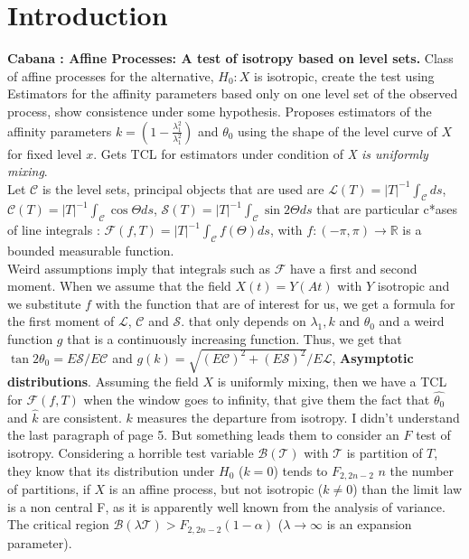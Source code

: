 \documentclass[12pt]{article}
\renewcommand{\hat}{\widehat}
\theoremstyle{Theorem}
\theoremstyle{definition}
\begin{document}
\section{Introduction}
\textbf{Cabana : Affine Processes: A test of isotropy based on level sets.} 
Class of affine processes for the alternative, $H_{0} :X$ is isotropic, create the test using Estimators for the affinity parameters based only on one level set of the observed process, show consistence under some hypothesis. Proposes estimators of the affinity parameters $k = (1 - \frac{\lambda_{1}^{2}}{\lambda_{1}^{2}})$ and $\theta_{0}$ using the shape of the level curve of $X$ for fixed level $x$. Gets TCL for estimators under condition of \textit{X is uniformly mixing}. \\
Let $\mathscr{C}$ is the level sets, principal objects that are used are $\mathscr{L}(T) = |T|^{-1}\int_{\mathscr{C}}ds$, $\mathscr{C}(T) = |T|^{-1}\int_{\mathcal{C}} \cos\Theta ds$, $\mathscr{S}(T) = |T|^{-1}\int_{\mathscr{C}} \sin2\Theta ds$ that are particular c*ases of line integrals : $\mathscr{F}(f, T) = |T|^{-1}\int_{\mathscr{C}}f(\Theta)ds$, with $f:(-\pi, \pi) \to \mathbb{R}$ is a bounded measurable function.\\
Weird assumptions imply that integrals such as $\mathscr{F}$ have a first and second moment. When we assume that the field $X(t) = Y(At)$ with $Y$ isotropic and we substitute $f$ with the function that are of interest for us, we get a formula for the first moment of $\mathscr{L}$, $\mathscr{C}$ and $\mathscr{S}$. that only depends on $\lambda_{1}, k$ and $\theta_{0}$ and a weird function $g$ that is a continuously increasing function. Thus, we get that $\tan 2\theta_{0} = E\mathscr{S}/E\mathscr{C}$ and $g(k) = \sqrt{(E\mathscr{C})^2 + (E\mathscr{S})^2}/E\mathscr{L}$, \textbf{Asymptotic distributions}. Assuming the field $X$ is uniformly mixing, then we have a TCL for $\mathscr{F}(f, T)$ when the window goes to infinity, that give them the fact that $\hat{\theta_{0}}$ and $\hat{k}$ are consistent. $k$ measures the departure from isotropy. I didn't understand the last paragraph of page 5. But something leads them to consider an $F$ test of isotropy. Considering a horrible test variable $\mathscr{B}(\mathscr{T})$ with $\mathscr{T}$ is partition of $T$, they know that its distribution under $H_{0}$ ($k = 0$) tends to $F_{2, 2n-2}$ $n$ the number of partitions, if $X$ is an affine process, but not isotropic ($k \neq 0$) than the limit law is a non central F, as it is apparently well known from the analysis of variance. The critical region $\mathscr{B}(\lambda \mathscr{T}) > F_{2, 2n-2}(1-\alpha)$ ($\lambda \to \infty$ is an expansion parameter). \\
\end{document}
